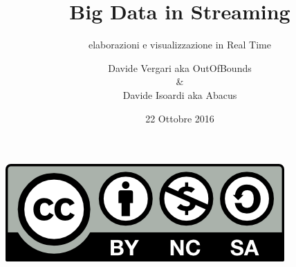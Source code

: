 
\title{Big Data in Streaming}
\subtitle{elaborazioni e visualizzazione in Real Time}
\author{Davide Vergari aka OutOfBounds \\ \& \\Davide Isoardi aka Abacus}
\date{22 Ottobre 2016}






\begin{frame}
	\maketitle
	\begin{center}
		\includegraphics[scale=0.45]{img/cc-nc-sa}
	\end{center}

\end{frame}















